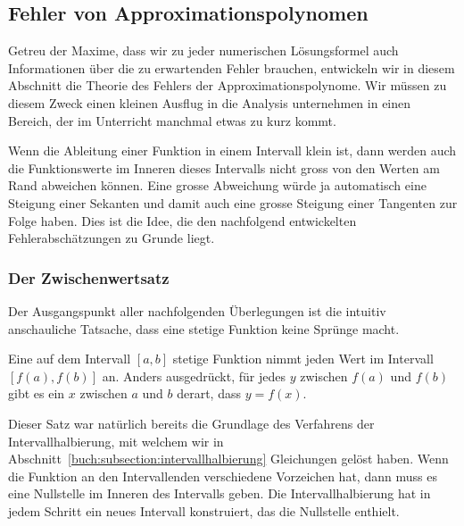 %
%
\subsection{Fehler von Approximationspolynomen
\label{buch:section:interpolation:fehler}}
Getreu der Maxime, dass wir zu jeder numerischen Lösungsformel auch
Informationen über die zu erwartenden Fehler brauchen, entwickeln
wir in diesem Abschnitt die Theorie des Fehlers der Approximationspolynome.
%
Wir müssen zu diesem Zweck einen kleinen Ausflug in die Analysis unternehmen
in einen Bereich, der im Unterricht manchmal etwas zu kurz kommt.

Wenn die Ableitung einer Funktion in einem Intervall klein ist,
dann werden auch die Funktionswerte im Inneren dieses Intervalls
nicht gross von den Werten am Rand abweichen können.
Eine grosse Abweichung würde ja automatisch eine Steigung einer Sekanten
und damit auch eine grosse Steigung einer Tangenten zur Folge haben.
%
%
Dies ist die Idee, die den nachfolgend entwickelten Fehlerabschätzungen
zu Grunde liegt.
%

\subsubsection{Der Zwischenwertsatz}
%
Der Ausgangspunkt aller nachfolgenden Überlegungen ist die intuitiv
anschauliche Tatsache, dass eine stetige Funktion keine Sprünge macht.

\begin{satz}[Zwischenwertsatz]
Eine auf dem Intervall $[a,b]$ stetige Funktion nimmt jeden Wert im
Intervall $[f(a),f(b)]$ an.
Anders ausgedrückt, für jedes $y$ zwischen $f(a)$ und $f(b)$ gibt es ein 
$x$ zwischen $a$ und $b$ derart, dass $y=f(x)$.
\end{satz}

Dieser Satz war natürlich bereits die Grundlage des Verfahrens der
Intervallhalbierung, mit welchem wir in
Abschnitt~\ref{buch:subsection:intervallhalbierung}
Gleichungen gelöst haben.
%
Wenn die Funktion an den Intervallenden verschiedene Vorzeichen hat,
dann muss es eine Nullstelle im Inneren des Intervalls geben.
%
Die Intervallhalbierung hat in jedem Schritt ein neues Intervall
konstruiert, das die Nullstelle enthielt.

